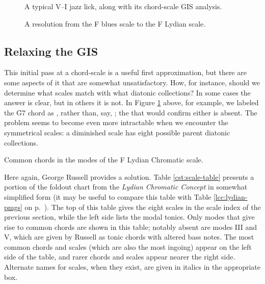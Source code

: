 \begin{figure}[tbp]
  \caption{A typical V--I jazz lick, along with its chord-scale \textsc{GIS}
    analysis.}
  \label{cst:gis-fiveone}
\end{figure}

\begin{figure}[tbp]
  \caption{A resolution from the F blues scale to the F Lydian scale.}
  \label{cst:gis-blues-lyd}
\end{figure}

\FloatBarrier
\subsection{Relaxing the GIS}
\label{subsec:relaxing-gis}

This initial pass at a chord-scale \gis is a useful first approximation, but
there are some aspects of it that are somewhat unsatisfactory. How, for
instance, should we determine what scales match with what diatonic
collections? In some cases the answer is clear, but in others it is not. In
Figure \ref{cst:gis-fiveone} above, for example, we labeled the \h{G7} chord
as , rather than, say, ; the  that would confirm either is absent. The problem seems
to become even more intractable when we encounter the symmetrical scales: a
diminished scale has eight possible parent diatonic collections.

\begin{table}[p]
  \caption{Common chords in the modes of the F Lydian Chromatic scale.}
  \label{cst:scale-table}
\end{table}

Here again, George Russell provides a solution. Table \ref{cst:scale-table}
presents a portion of the foldout chart from the \emph{Lydian Chromatic Concept}
in somewhat simplified form (it may be useful to compare this table with Table
\ref{lcc:lydian-pmgs} on p.~\pageref{lcc:lydian-pmgs}). The top of this table
gives the eight scales in the scale index of the previous section, while the
left side lists the modal tonics. Only modes that give rise to
common chords are shown in this table; notably absent are modes III and V,
which are given by Russell as tonic chords with altered bass notes. The most
common chords and scales (which are also the most ingoing) appear on the left
side of the table, and rarer chords and scales appear nearer the right side.
Alternate names for scales, when they exist, are given in italics in the
appropriate box.

